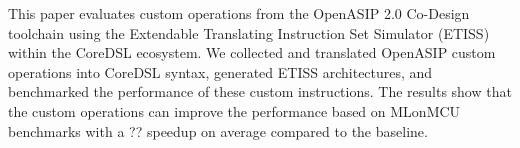 This paper evaluates custom operations from the OpenASIP 2.0 Co-Design toolchain using the Extendable Translating Instruction Set Simulator (ETISS) within the CoreDSL ecosystem. We collected and translated OpenASIP custom operations into CoreDSL syntax, generated ETISS architectures, and benchmarked the performance of these custom instructions. The results show that the custom operations can improve the performance based on MLonMCU benchmarks with a ?? speedup on average compared to the baseline. %